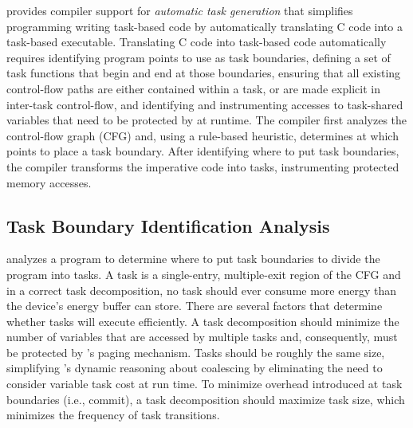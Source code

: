 \sys provides compiler support for \emph{automatic task generation} that simplifies programming writing task-based code by automatically translating C code into a task-based executable.  Translating C code into task-based code automatically requires identifying program points to use as task boundaries, defining a set of task functions that begin and end at those boundaries, ensuring that all existing control-flow paths are either contained within a task, or are made explicit in inter-task control-flow, and identifying and instrumenting accesses to task-shared variables that need to be protected by \sys at runtime.  The \sys compiler first analyzes the control-flow graph (CFG) and, using a rule-based heuristic, determines at which points to place a task boundary.  After identifying where to put task boundaries, the \sys compiler transforms the imperative code into tasks, instrumenting protected memory accesses. 

%
%

\subsection{Task Boundary Identification Analysis}
\label{sec:compiler_analysis_pass}


\sys analyzes a program to determine where to put task boundaries to divide the
program into tasks. A task is a single-entry, multiple-exit region of the CFG
and in a correct task decomposition, no task should ever consume more energy
than the device's energy buffer can store.  There are several factors that
determine whether tasks will execute efficiently. A task decomposition should
minimize the number of variables that are accessed by multiple tasks and, 
consequently, must be protected by \sys's paging mechanism.  Tasks should
be roughly the same size, simplifying \sys's dynamic reasoning about coalescing
by eliminating the need to consider variable task cost at run time.  To minimize
overhead introduced at task boundaries (i.e., commit), a task decomposition should 
maximize task size, which minimizes the frequency of task transitions.



